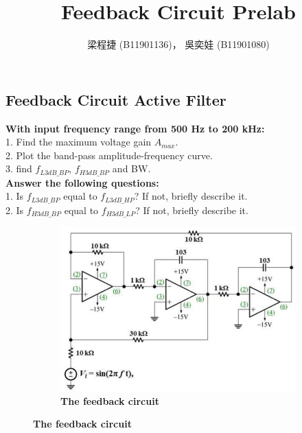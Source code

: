 \documentclass{article}
\title{Feedback Circuit Prelab}
\author{梁程捷 (B11901136)， 吳奕娃 (B11901080)}
\date{}
\begin{document}
\begin{CJK*}{UTF8}{bkai}

\maketitle

\section*{Feedback Circuit Active Filter}
\textbf{With input frequency range from 500 \unit{\hertz} to 200 \unit{\kilo\hertz}:}    \\
1. Find the maximum voltage gain $A_{max}$.   \\
2. Plot the band-pass amplitude-frequency curve.    \\
3. find $f_{L3dB\_BP}$, $f_{H3dB\_BP}$ and BW.    \vspace{3mm} \\ 
\textbf{Answer the following questions:}     \\
1. Is $f_{L3dB\_BP}$ equal to $f_{L3dB\_HP}$? If not, briefly describe it.    \\
2. Is $f_{H3dB\_BP}$ equal to $f_{H3dB\_LP}$? If not, briefly describe it.    \\


\begin{figure}[h]
    \begin{center}
    
        \begin{subfigure}[b]{0.8\textwidth}
            \includegraphics[width=\textwidth]{feedback_circuit.png}
            \caption*{\textbf{The feedback circuit}}
        \end{subfigure}
    \end{center}
\end{figure}

    
\end{CJK*}
\end{document}
